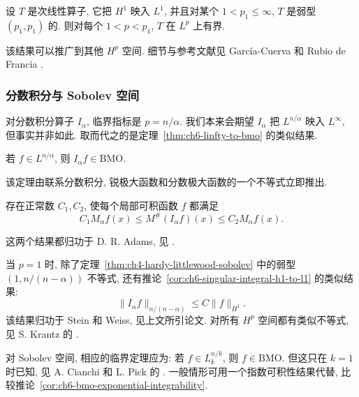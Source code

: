 \begin{Theorem}
\label{thm:ch6-h1-weak-interpolation}
设 $T$ 是次线性算子, 它把 $H^1$ 映入 $L^1$, 并且对某个 $1<p_1\le\infty$, $T$ 是弱型 $(p_1,p_1)$ 的. 则对每个 $1<p<p_1$, $T$ 在 $L^p$ 上有界.
\end{Theorem}

该结果可以推广到其他 $H^p$ 空间. 细节与参考文献见 García-Cuerva 和 Rubio de Francia .

\subsubsection{分数积分与 Sobolev 空间}
\label{subsec:ch6-fractional-sobolev}

对分数积分算子 $I_\alpha$, 临界指标是 $p=n/\alpha$. 我们本来会期望 $I_\alpha$ 把 $L^{n/\alpha}$ 映入 $L^\infty$, 但事实并非如此. 取而代之的是定理~\ref{thm:ch6-linfty-to-bmo} 的类似结果.

\hypertarget{chapter-06-page-142}{}
\begin{Theorem}
\label{thm:ch6-fractional-integral-to-bmo}
若 $f\in L^{n/\alpha}$, 则 $I_\alpha f\in\mathrm{BMO}$.
\end{Theorem}

该定理由联系分数积分, 锐极大函数和分数极大函数的一个不等式立即推出.

\begin{Theorem}
\label{thm:ch6-fractional-sharp-maximal-comparison}
存在正常数 $C_1,C_2$, 使每个局部可积函数 $f$ 都满足
\[
 C_1M_\alpha f(x)\le M^\#(I_\alpha f)(x)\le C_2M_\alpha f(x).
\]
\end{Theorem}

这两个结果都归功于 D. R. Adams, 见 .

当 $p=1$ 时, 除了定理~\ref{thm:ch4-hardy-littlewood-sobolev} 中的弱型 $(1,n/(n-\alpha))$ 不等式, 还有推论~\ref{cor:ch6-singular-integral-h1-to-l1} 的类似结果:
\[
 \|I_\alpha f\|_{n/(n-\alpha)}\le C\|f\|_{H^1}.
\]
该结果归功于 Stein 和 Weiss, 见上文所引论文. 对所有 $H^p$ 空间都有类似不等式, 见 S. Krantz 的 .

对 Sobolev 空间, 相应的临界定理应为: 若 $f\in L_k^{n/k}$, 则 $f\in\mathrm{BMO}$. 但这只在 $k=1$ 时已知, 见 A. Cianchi 和 L. Pick 的 . 一般情形可用一个指数可积性结果代替, 比较推论~\ref{cor:ch6-bmo-exponential-integrability}.

